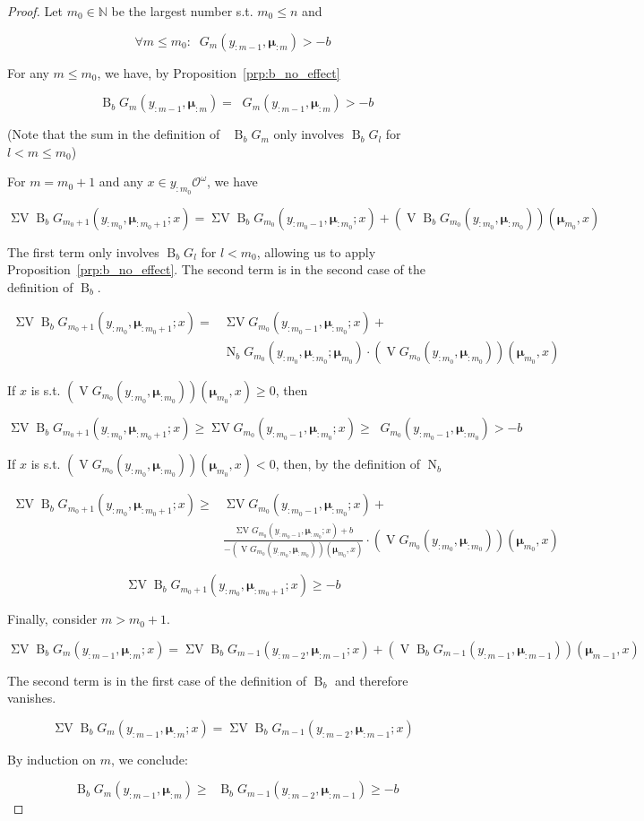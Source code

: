 \documentclass[11pt]{article}
\theoremstyle{definition}
\theoremstyle{plain}
\newcommand{\Nats}{\mathbb{N}}
\newcommand{\B}{\operatorname{B}}
\newcommand{\Ob}{\mathcal{O}}
\newcommand{\OO}{\Ob^\omega}
\DeclareMathOperator{\V}{V}
\DeclareMathOperator{\SV}{\Sigma V}
\DeclareMathOperator{\SVM}{\Sigma V_{\min}}
\DeclareMathOperator{\Nr}{N}
\newcommand{\BM}{\bm{\mu}}
\begin{document}
\begin{proof}

Let ${m_0 \in \Nats}$ be the largest number s.t. ${m_0 \leq n}$ and 

$$\forall m \leq m_0: \SVM G_m(y_{:m-1},\BM_{:m}) > -b$$

For any ${m \leq m_0}$, we have, by Proposition~\ref{prp:b_no_effect}

$$\SVM \B_b G_m(y_{:m-1},\BM_{:m})=\SVM G_m(y_{:m-1},\BM_{:m}) > -b$$

(Note that the sum in the definition of ${\SVM \B_b G_m}$ only involves ${\B_b G_l}$ for ${l < m \leq m_0}$)

For ${m=m_0+1}$ and any $x \in y_{:m_0}\OO$, we have

$$\SV \B_b G_{m_0+1}(y_{:m_0},\BM_{:m_0+1};x) = \SV \B_b G_{m_0}(y_{:m_0-1},\BM_{:m_0};x) + (\V \B_b G_{m_0}(y_{:m_0},\BM_{:m_0}))(\BM_{m_0},x)$$

The first term only involves ${\B_b G_l}$ for ${l < m_0}$, allowing us to apply Proposition~\ref{prp:b_no_effect}. The second term is in the second case of the definition of $\B_b$.

\begin{align*}
\SV \B_b G_{m_0+1}(y_{:m_0},\BM_{:m_0+1};x) = &\SV G_{m_0}(y_{:m_0-1},\BM_{:m_0};x) +\\ &\Nr_b G_{m_0}(y_{:m_0},\BM_{:m_0};\BM_{m_0}) \cdot (\V G_{m_0}(y_{:m_0},\BM_{:m_0}))(\BM_{m_0},x)
\end{align*}

If ${x}$ is s.t. ${(\V G_{m_0}(y_{:m_0},\BM_{:m_0}))(\BM_{m_0},x) \geq 0}$, then

\[\SV \B_b G_{m_0+1}(y_{:m_0},\BM_{:m_0+1};x) \geq \SV G_{m_0}(y_{:m_0-1},\BM_{:m_0};x)\geq \SVM G_{m_0}(y_{:m_0-1},\BM_{:m_0}) > -b\]

If ${x}$ is s.t. ${(\V G_{m_0}(y_{:m_0},\BM_{:m_0}))(\BM_{m_0},x) < 0}$, then, by the definition of $\Nr_b$

\begin{align*}
\SV \B_b G_{m_0+1}(y_{:m_0},\BM_{:m_0+1};x) \geq &\SV G_{m_0}(y_{:m_0-1},\BM_{:m_0};x)+ \\
&\frac{\SV G_{m_0}(y_{:m_0-1},\BM_{:m_0};x) + b}{-(\V G_{m_0}(y_{:m_0},\BM_{:m_0}))(\BM_{m_0},x)} \cdot (\V G_{m_0}(y_{:m_0},\BM_{:m_0}))(\BM_{m_0},x)
\end{align*}

$$\SV \B_b G_{m_0+1}(y_{:m_0},\BM_{:m_0+1};x) \geq -b$$

Finally, consider ${m > m_0 + 1}$.

$$\SV \B_b G_{m}(y_{:m-1},\BM_{:m};x) = \SV \B_b G_{m-1}(y_{:m-2},\BM_{:m-1};x) + (\V \B_b G_{m-1}(y_{:m-1},\BM_{:m-1}))(\BM_{m-1},x)$$

The second term is in the first case of the definition of $\B_b$ and therefore vanishes.

$$\SV \B_b G_{m}(y_{:m-1},\BM_{:m};x) = \SV \B_b G_{m-1}(y_{:m-2},\BM_{:m-1};x)$$

By induction on ${m}$, we conclude:

$$\SVM \B_b G_{m}(y_{:m-1},\BM_{:m}) \geq \SVM \B_b G_{m-1}(y_{:m-2},\BM_{:m-1}) \geq -b$$

\end{proof}
\end{document}
